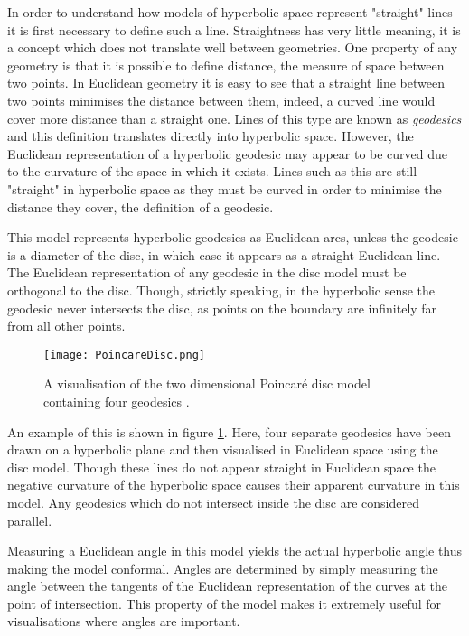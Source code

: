 In order to understand how models of hyperbolic space represent "straight" lines it is first necessary to define such a line. Straightness has very little meaning, it is a concept which does not translate well between geometries. One property of any geometry is that it is possible to define distance, the measure of space between two points. In Euclidean geometry it is easy to see that a straight line between two points minimises the distance between them, indeed, a curved line would cover more distance than a straight one. Lines of this type are known as \textit{geodesics} and this definition translates directly into hyperbolic space. However, the Euclidean representation of a hyperbolic geodesic may appear to be curved due to the curvature of the space in which it exists. Lines such as this are still "straight" in hyperbolic space as they must be curved in order to minimise the distance they cover, the definition of a geodesic.

This model represents hyperbolic geodesics as Euclidean arcs, unless the geodesic is a diameter of the disc, in which case it appears as a straight Euclidean line. The Euclidean representation of any geodesic in the disc model must be orthogonal to the disc. Though, strictly speaking, in the hyperbolic sense the geodesic never intersects the disc, as points on the boundary are infinitely far from all other points.

\begin{figure}
	\centering
	\texttt{[image: PoincareDisc.png]}
	\caption[A visualisation of the two dimensional Poincar\'{e} disc model containing four geodesics]{A visualisation of the two dimensional Poincar\'{e} disc model containing four geodesics .}
	\label{fig:poincare_example}
\end{figure}

An example of this is shown in figure \ref{fig:poincare_example}. Here, four separate geodesics have been drawn on a hyperbolic plane and then visualised in Euclidean space using the disc model. Though these lines do not appear straight in Euclidean space the negative curvature of the hyperbolic space causes their apparent curvature in this model. Any geodesics which do not intersect inside the disc are considered parallel.

Measuring a Euclidean angle in this model yields the actual hyperbolic angle thus making the model conformal. Angles are determined by simply measuring the angle between the tangents of the Euclidean representation of the curves at the point of intersection. This property of the model makes it extremely useful for visualisations where angles are important.

